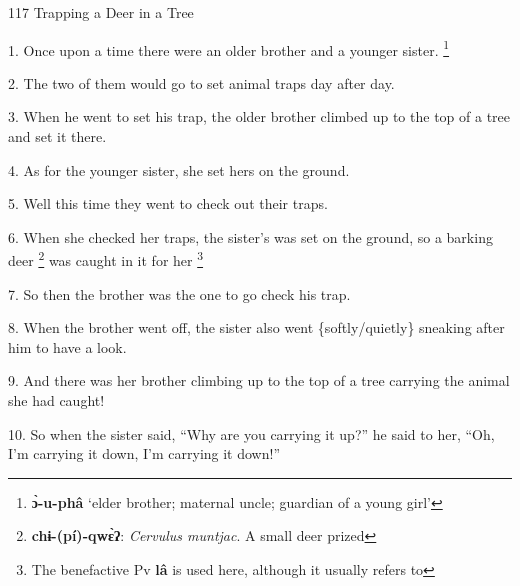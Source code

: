 
117 Trapping a Deer in a Tree

1. Once upon a time there were an older brother and a younger sister. \footnote{\textbf{ɔ̀-u-phâ} `elder brother; maternal uncle; guardian of a young girl'}

2. The two of them would go to set animal traps day after day.

3. When he went to set his trap, the older brother climbed up to the top of a tree
and set it there.

4. As for the younger sister, she set hers on the ground.

5. Well this time they went to check out their traps.

6. When she checked her traps, the sister's was set on the ground, so a barking
deer \footnote{\textbf{chɨ-(pí)-qwɛ̀ʔ}: \textit{Cervulus muntjac}. A small deer prized} was caught in it for her \.\footnote{The benefactive Pv \textbf{lâ} is used here, although it usually refers to}

7. So then the brother was the one to go check his trap.

8. When the brother went off, the sister also went \{softly/quietly\} sneaking
after him to have a look.

9. And there was her brother climbing up to the top of a tree carrying the animal
she had caught!

10. So when the sister said, ``Why are you carrying it up?'' he said to her, ``Oh,
I'm carrying it down, I'm carrying it down!''

